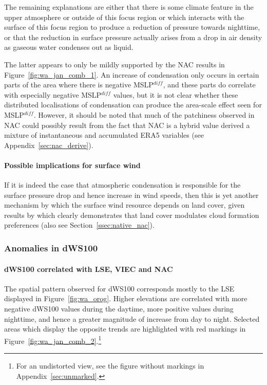 The remaining explanations are either that there is some climate feature in the upper atmosphere or outside of this focus region or which interacts with the surface of this focus region to produce a reduction of pressure towards nighttime, or that the reduction in surface pressure actually arises from a drop in air density as gaseous water condenses out as liquid.

The latter appears to only be mildly supported by the \ac{NAC} results in Figure~\ref{fig:wa_jan_comb_1}. An increase of condensation only occurs in certain parts of the area where there is negative \ac{MSLP}$^{diff}$, and these parts do correlate with especially negative \ac{MSLP}$^{diff}$ values, but it is not clear whether these distributed localisations of condensation can produce the area-scale effect seen for \ac{MSLP}$^{diff}$. However, it should be noted that much of the patchiness observed in \ac{NAC} could possibly result from the fact that \ac{NAC} is a hybrid value derived a mixture of instantaneous and accumulated \ac{ERA5} variables (see Appendix~\ref{sec:nac_derive}).

\paragraph{Possible implications for surface wind}

If it is indeed the case that atmospheric condensation is responsible for the surface pressure drop and hence increase in wind speeds, then this is yet another mechanism by which the surface wind resource depends on land cover, given results by \citep{lyons2002, ray2003} which clearly demonstrates that land cover modulates cloud formation preferences (also see Section~\ref{ssec:native_nac}).

\subsubsection{Anomalies in dWS100}

\paragraph{dWS100 correlated with LSE, VIEC and NAC}

The spatial pattern observed for \acs{dWS100} corresponds mostly to the \ac{LSE} displayed in Figure~\ref{fig:wa_orog}. Higher elevations are correlated with more negative d\ac{WS100} values during the daytime, more positive values during nighttime, and hence a greater magnitude of increase from day to night. Selected areas which display the opposite trends are highlighted with red markings in Figure~\ref{fig:wa_jan_comb_2}.\footnote{For an undistorted view, see the figure without markings in Appendix~\ref{sec:unmarked}.}

